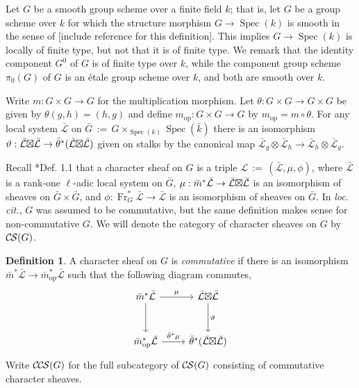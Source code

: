 \documentclass[10pt]{amsart}
\theoremstyle{plain}
\theoremstyle{definition}
\newtheorem{definition}[theorem]{Definition}
\newcommand{\bFq}{\bar{k}}
\newcommand{\Fq}{k}
\newcommand{\Frob}[1]{\operatorname{Fr}_{#1}}
\newcommand{\Spec}[1]{{\operatorname{Spec}(#1)}}
\newcommand{\op}{_{\operatorname{op}}}
\newcommand{\ceq}{{\, :=\, }}
\newcommand{\cs}[1]{{\mathcal{#1}}}
\newcommand{\gcs}[1]{{\mathcal{\bar #1}}}
\newcommand{\CS}{{\mathcal{C\hskip-0.8pt S}}}
\newcommand{\CCS}{{\mathcal{C\hskip-.8pt C\hskip-0.8pt S}}}
\newcommand{\bm}{\bar{m}}
\newcommand{\bG}{\bar{G}}
\newcommand{\tight}[3]{\hspace{-#1pt}{#2}\hspace{-#3pt}}
\newcommand{\LxL}{\text{$\gcs{L} \tight{0}{\boxtimes}{0} \gcs{L}$}}
\begin{document}
Let $G$ be a smooth group scheme over a finite field $\Fq$; that is, let $G$ be a group scheme over $\Fq$
for which the structure morphism $G \to \Spec{\Fq}$ is smooth in the sense of [include reference for this definition].
This implies $G \to \Spec{\Fq}$ is locally of finite type, but not that it is of finite type.
We remark that the identity component $G^0$ of $G$ is of finite type over $\Fq$, while the component group scheme
$\pi_0(G)$ of $G$ is an \'etale group scheme over $\Fq$, and both are smooth over $\Fq$.

Write $m : G \times G \to G$ for the multiplication morphism.
Let $\theta : G\times G \to G\times G$ be given by $\theta(g,h) = (h,g)$
and define $m\op : G \times G \to G$ by $m\op = m \circ \theta$.
For any local system $\gcs{L}$ on $\bG \ceq G \times_{\Spec{\Fq}} \Spec{\bFq}$ there is an isomorphism
$\vartheta : \LxL \to {\bar \theta}^*(\LxL)$ given on stalks by the canonical map
$\gcs{L}_{g} \otimes \gcs{L}_{h} \to \gcs{L}_{h} \otimes \gcs{L}_{g}$.

Recall \cite{cunningham-roe:13a}*{Def. 1.1} that a character sheaf on $G$ is a triple $\cs{L} \ceq (\gcs{L}, \mu, \phi)$,
where $\gcs{L}$ is a rank-one $\ell$-adic local system on $\bG$, $\mu : \bm^* \gcs{L} \to \LxL$ is an isomorphism
of sheaves on $\bG \times \bG$, and $\phi : \Frob{G}^* \gcs{L} \to \gcs{L}$ is an isomorphism of sheaves on $\bG$.
In \emph{loc. cit.}, $G$ was assumed to be commutative, but the same definition makes sense for non-commutative $G$.
We will denote the category of character sheaves on $G$ by $\CS(G)$.

\begin{definition}\label{def:CCS}
A character sheaf on $G$ is \emph{commutative} if there is an isomorphism ${\bar m}^* \gcs{L} \to {\bar m}\op^* \gcs{L}$
such that the following diagram commutes,
  \[
  \begin{tikzcd}[row sep=30]
   \bm^*\gcs{L} \arrow{d} \arrow{r}{\mu} & \LxL \arrow{d}{\vartheta}\\
   \bm\op^*\gcs{L} \arrow{r}{{\bar \theta}^*\mu} &  {\bar \theta}^*(\LxL)
  \end{tikzcd}
  \]
 Write $\CCS(G)$ for the full subcategory of $\CS(G)$ consisting of commutative character sheaves.
 \end{definition}
 
\end{document}
